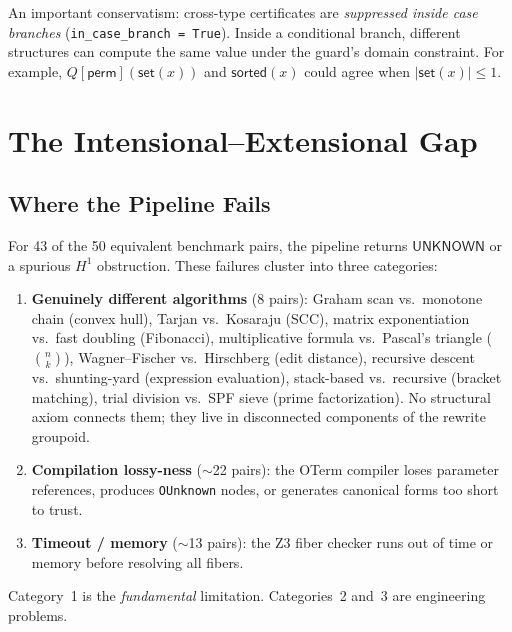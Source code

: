 An important conservatism: cross-type certificates are
\emph{suppressed inside case branches}
(\texttt{in\_case\_branch = True}).  Inside a conditional branch,
different structures can compute the same value under the guard's
domain constraint.  For example, $Q[\mathsf{perm}](\mathsf{set}(x))$
and $\mathsf{sorted}(x)$ could agree when
$|\mathsf{set}(x)| \leq 1$.


\section{The Intensional--Extensional Gap}
\label{sec:int-ext-gap}

\subsection{Where the Pipeline Fails}

For 43 of the 50 equivalent benchmark pairs, the pipeline returns
$\mathsf{UNKNOWN}$ or a spurious $H^1$ obstruction.  These failures
cluster into three categories:

\begin{enumerate}
  \item \textbf{Genuinely different algorithms} (8 pairs):
    Graham scan vs.\ monotone chain (convex hull),
    Tarjan vs.\ Kosaraju (SCC),
    matrix exponentiation vs.\ fast doubling (Fibonacci),
    multiplicative formula vs.\ Pascal's triangle ($\binom{n}{k}$),
    Wagner--Fischer vs.\ Hirschberg (edit distance),
    recursive descent vs.\ shunting-yard (expression evaluation),
    stack-based vs.\ recursive (bracket matching),
    trial division vs.\ SPF sieve (prime factorization).
    No structural axiom connects them; they live in disconnected
    components of the rewrite groupoid.

  \item \textbf{Compilation lossy-ness} ($\sim$22 pairs):
    the OTerm compiler loses parameter references, produces
    \texttt{OUnknown} nodes, or generates canonical forms too
    short to trust.

  \item \textbf{Timeout / memory} ($\sim$13 pairs):
    the Z3 fiber checker runs out of time or memory before
    resolving all fibers.
\end{enumerate}

Category~1 is the \emph{fundamental} limitation.  Categories~2 and~3
are engineering problems.

